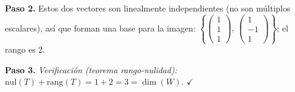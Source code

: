 \begin{prob}
\begin{enumerate}[$a)$]
\begin{myproof}
\textbf{Paso 2.} Estos dos vectores son linealmente independientes (no son múltiplos escalares), así que forman una base para la imagen:
$\boxed{\left\{\begin{pmatrix}1\\1\\1\end{pmatrix},\,\begin{pmatrix}1\\-1\\1\end{pmatrix}\right\}}$; el rango es $2$.

\textbf{Paso 3.} \textit{Verificación (teorema rango-nulidad):} $\mathrm{nul}(T) + \mathrm{rang}(T) = 1 + 2 = 3 = \dim(W)$. $\checkmark$
\end{myproof}
\end{enumerate}
\end{prob}

